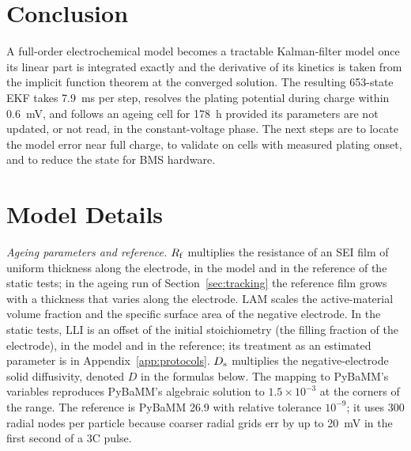 \documentclass[journal]{IEEEtran}
\newcommand{\LAM}{\mathrm{LAM}}\newcommand{\LLI}{\mathrm{LLI}}\newcommand{\phipl}{\phi_{\mathrm{pl}}}
\begin{document}
\section{Conclusion}
A full-order electrochemical model becomes a tractable Kalman-filter model once its linear part is integrated exactly and the derivative of its kinetics is taken from the implicit function theorem at the converged solution. The resulting 653-state EKF takes \SI{7.9}{\milli\second} per step, resolves the plating potential during charge within \SI{0.6}{\milli\volt}, and follows an ageing cell for \SI{178}{\hour} provided its parameters are not updated, or not read, in the constant-voltage phase. The next steps are to locate the model error near full charge, to validate on cells with measured plating onset, and to reduce the state for BMS hardware.

\appendices
\section{Model Details}\label{app:model}
\emph{Ageing parameters and reference.} $R_{\mathrm{f}}$ multiplies the resistance of an SEI film of uniform thickness along the electrode, in the model and in the reference of the static tests; in the ageing run of Section~\ref{sec:tracking} the reference film grows with a thickness that varies along the electrode. $\LAM$ scales the active-material volume fraction and the specific surface area of the negative electrode. In the static tests, $\LLI$ is an offset of the initial stoichiometry (the filling fraction of the electrode), in the model and in the reference; its treatment as an estimated parameter is in Appendix~\ref{app:protocols}. $D_{\mathrm{s}}$ multiplies the negative-electrode solid diffusivity, denoted $D$ in the formulas below. The mapping to PyBaMM's variables reproduces PyBaMM's algebraic solution to $1.5\times10^{-3}$ at the corners of the range. The reference is PyBaMM 26.9 with relative tolerance $10^{-9}$; it uses 300 radial nodes per particle because coarser radial grids err by up to \SI{20}{\milli\volt} in the first second of a 3C pulse.
\end{document}
